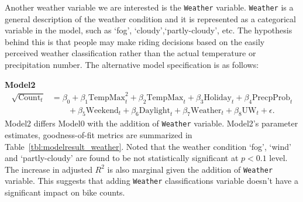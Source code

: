 \documentclass [11pt, proquest] {uwthesis}[2015/03/03]
\begin{document}
Another weather variable we are interested is the \texttt{Weather} variable. \texttt{Weather} is a general description of the weather condition and it is represented as a categorical variable in the model, such as `fog', `cloudy',`partly-cloudy', etc. The hypothesis behind this is that people may make riding decisions based on the easily perceived weather classification rather than the actual temperature or precipitation number. The alternative model specification is as follows:

\textbf{Model2}
\begin{align}
\sqrt{\text{Count}_t} &= \beta_0 + \beta_1 \text{TempMax}^2_t + \beta_2 \text{TempMax}_t + \beta_3 \text{Holiday}_t + \beta_4 \text{PrecpProb}_t  \nonumber\\
&\qquad + \beta_5 \text{Weekend}_t + \beta_6 \text{Daylight}_t + \beta_7 \text{Weather}_t  + \beta_8 \text{UW}_t + \epsilon.\label{eqref:model2}
\end{align}
Model2 differs Model0 with the addition of \texttt{Weather} variable. Model2's parameter estimates, goodness-of-fit metrics are summarized in Table~\ref{tbl:modelresult_weather}. Noted that the weather condition `fog', `wind' and `partly-cloudy' are found to be not statistically significant at $p<0.1$ level. The increase in adjusted $R^2$ is also marginal given the addition of \texttt{Weather} variable. This suggests that adding \texttt{Weather} classifications variable doesn't have a significant impact on bike counts.
\end{document}
